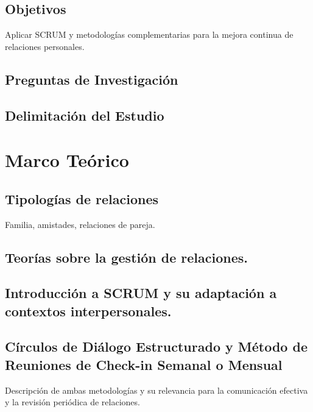 \documentclass[letterpaper,12pt]{article} %
\begin{document}
	\subsection{Objetivos}
	
	
	Aplicar SCRUM y metodologías complementarias para la mejora continua de relaciones personales.
	
	\subsection{Preguntas de Investigación}
	
	\subsection{Delimitación del Estudio}
	
	\section{Marco Teórico}
	\subsection{Tipologías de relaciones}
	Familia, amistades, relaciones de pareja.
	
	\subsection{Teorías sobre la gestión de relaciones.}
	
	\subsection{Introducción a SCRUM y su adaptación a contextos interpersonales.}
	
	\subsection{Círculos de Diálogo Estructurado y Método de Reuniones de Check-in Semanal o Mensual}
	Descripción de ambas metodologías y su relevancia para la comunicación efectiva y la revisión periódica de relaciones.
	
\end{document}
